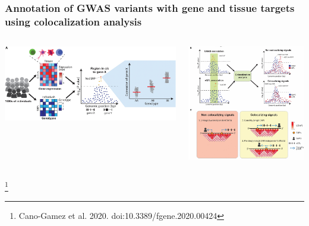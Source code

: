 \documentclass{beamer}
\newcommand\blfootnote[1]{%
    \begingroup
    \renewcommand\thefootnote{}\footnote{#1}%
    \addtocounter{footnote}{-1}%
    \endgroup
}
\begin{document}
    \begin{frame}
        \frametitle{Annotation of GWAS variants with gene and tissue targets using colocalization analysis}

        \begin{columns}
            \begin{column}{0.5\textwidth}
                \begin{center}
                    \includegraphics[width=\textwidth]{../presentation_230120_gold2022_paris/fig/doi_10.3389_fgene.2020.00424_fig4a.jpg}
                \end{center}
            \end{column}
            \begin{column}{0.5\textwidth}
                \begin{center}
                    \includegraphics[width=\textwidth]{../presentation_230120_gold2022_paris/fig/doi_10.3389_fgene.2020.00424_fig4bc.png}
                \end{center}
            \end{column}
        \end{columns}

        \blfootnote{Cano-Gamez et al. 2020. doi:10.3389/fgene.2020.00424}
    \end{frame}
\end{document}
